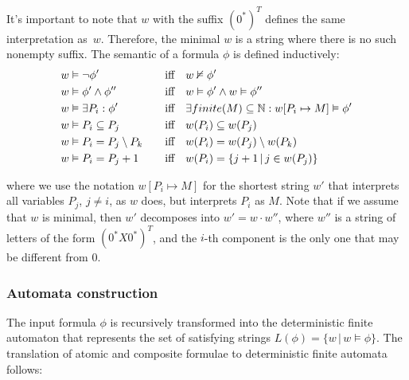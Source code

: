 \documentclass[pdflatex,sn-mathphys-num]{sn-jnl}%
\theoremstyle{thmstyleone}%
\theoremstyle{thmstyletwo}%
\theoremstyle{thmstylethree}%
\begin{document}
            \noindent It's important to note that $w$ with the suffix $(0^*)^T$ defines the same interpretation as~$w$. Therefore, the minimal $w$ is a string where there is no such nonempty suffix. The semantic of a formula $\phi$ is defined inductively:
                \begin{alignat*}{2}
                    &w \vDash \neg \phi' \quad && \textnormal{iff}\quad  w \nvDash \phi'\\
                    &w \vDash \phi' \land \phi'' \quad &&\textnormal{iff}\quad  w \vDash \phi' \land w \vDash \phi''\\
                    &w \vDash \exists P_i : \phi' \quad &&\textnormal{iff}\quad  \exists finite(M) \subseteq \mathbb{N} : w[P_i \mapsto M] \vDash \phi'\\
                    &w \vDash P_i \subseteq P_j \quad &&\textnormal{iff}\quad  w(P_i) \subseteq w(P_j)\\
                    &w \vDash P_i = P_j \setminus P_k \quad &&\textnormal{iff}\quad  w(P_i) = w(P_j) \setminus w(P_k)\\
                    &w \vDash P_i = P_j + 1 \quad &&\textnormal{iff}\quad  w(P_i) = \{j + 1\,|\, j \in w(P_j)\}
                \end{alignat*}

                \noindent where we use the notation $w[P_i \mapsto M]$ for the shortest string $w'$ that interprets all variables $P_j$, $j \neq i$, as $w$ does, but interprets $P_i$ as $M$. Note that if we assume that $w$ is minimal, then $w'$ decomposes into $w' = w \cdot w''$, where $w''$ is a string of letters of the form $(0^*X0^*)^T$, and the $i$-th component is the only one that may be different from 0.

        \subsubsection*{Automata construction}
            The input formula $\phi$ is recursively transformed into the deterministic finite automaton that represents the set of satisfying strings $L(\phi) = \{w\,|\, w \vDash \phi\}$. The translation of atomic and composite formulae to deterministic finite automata follows:


            \vspace*{0.5em}
\end{document}
